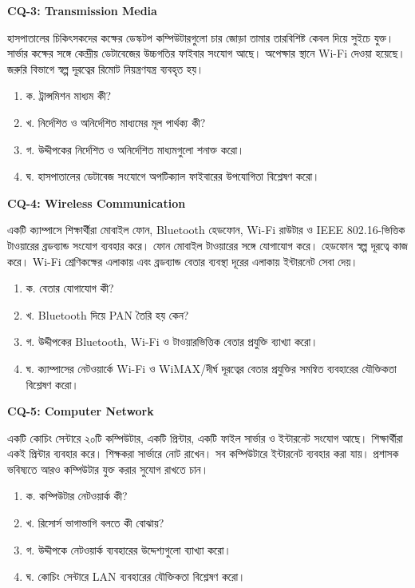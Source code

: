\textbf{CQ-3: Transmission Media}

হাসপাতালের চিকিৎসকদের কক্ষের ডেস্কটপ কম্পিউটারগুলো চার জোড়া তামার তারবিশিষ্ট কেবল দিয়ে সুইচে যুক্ত। সার্ভার কক্ষের সঙ্গে কেন্দ্রীয় ডেটাবেজের উচ্চগতির ফাইবার সংযোগ আছে। অপেক্ষার স্থানে Wi-Fi দেওয়া হয়েছে। জরুরি বিভাগে স্বল্প দূরত্বের রিমোট নিয়ন্ত্রণযন্ত্র ব্যবহৃত হয়।

\begin{enumerate}
\item ক. ট্রান্সমিশন মাধ্যম কী?
\item খ. নির্দেশিত ও অনির্দেশিত মাধ্যমের মূল পার্থক্য কী?
\item গ. উদ্দীপকের নির্দেশিত ও অনির্দেশিত মাধ্যমগুলো শনাক্ত করো।
\item ঘ. হাসপাতালের ডেটাবেজ সংযোগে অপটিক্যাল ফাইবারের উপযোগিতা বিশ্লেষণ করো।
\end{enumerate}

\textbf{CQ-4: Wireless Communication}

একটি ক্যাম্পাসে শিক্ষার্থীরা মোবাইল ফোন, Bluetooth হেডফোন, Wi-Fi রাউটার ও IEEE 802.16-ভিত্তিক টাওয়ারের ব্রডব্যান্ড সংযোগ ব্যবহার করে। ফোন মোবাইল টাওয়ারের সঙ্গে যোগাযোগ করে। হেডফোন স্বল্প দূরত্বে কাজ করে। Wi-Fi শ্রেণিকক্ষের এলাকায় এবং ব্রডব্যান্ড বেতার ব্যবস্থা দূরের এলাকায় ইন্টারনেট সেবা দেয়।

\begin{enumerate}
\item ক. বেতার যোগাযোগ কী?
\item খ. Bluetooth দিয়ে PAN তৈরি হয় কেন?
\item গ. উদ্দীপকের Bluetooth, Wi-Fi ও টাওয়ারভিত্তিক বেতার প্রযুক্তি ব্যাখ্যা করো।
\item ঘ. ক্যাম্পাসের নেটওয়ার্কে Wi-Fi ও WiMAX/দীর্ঘ দূরত্বের বেতার প্রযুক্তির সমন্বিত ব্যবহারের যৌক্তিকতা বিশ্লেষণ করো।
\end{enumerate}

\textbf{CQ-5: Computer Network}

একটি কোচিং সেন্টারে ২০টি কম্পিউটার, একটি প্রিন্টার, একটি ফাইল সার্ভার ও ইন্টারনেট সংযোগ আছে। শিক্ষার্থীরা একই প্রিন্টার ব্যবহার করে। শিক্ষকরা সার্ভারে নোট রাখেন। সব কম্পিউটারে ইন্টারনেট ব্যবহার করা যায়। প্রশাসক ভবিষ্যতে আরও কম্পিউটার যুক্ত করার সুযোগ রাখতে চান।

\begin{enumerate}
\item ক. কম্পিউটার নেটওয়ার্ক কী?
\item খ. রিসোর্স ভাগাভাগি বলতে কী বোঝায়?
\item গ. উদ্দীপকে নেটওয়ার্ক ব্যবহারের উদ্দেশ্যগুলো ব্যাখ্যা করো।
\item ঘ. কোচিং সেন্টারে LAN ব্যবহারের যৌক্তিকতা বিশ্লেষণ করো।
\end{enumerate}

